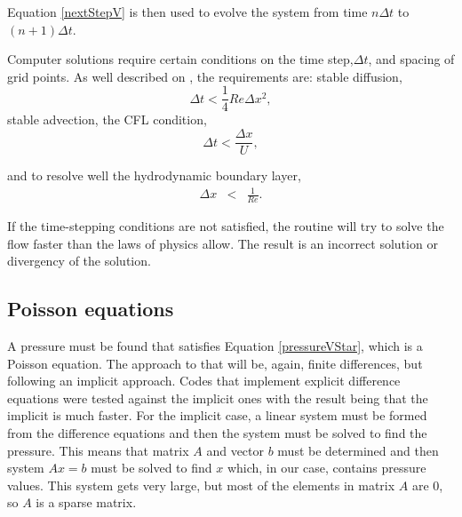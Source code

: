 \documentclass[journal]{IEEEtran}
\begin{document}
Equation \ref{nextStepV} is then used to evolve the system from time $n \Delta t$ to $(n+1)\Delta t$. 

Computer solutions require certain conditions on the time step,$\Delta t$, and spacing of grid points. As well described on \cite{hinchLectureNotes}, the requirements are: stable diffusion, 
\begin{equation}
\Delta t < \frac{1}{4}\mathit{Re}\Delta x^2, \label{stablediffusion}
\end{equation} stable advection, the CFL condition,
\begin{equation}
\Delta t < \frac{\Delta x}{U}, \label{stableadvection}
\end{equation}

 and to resolve well the hydrodynamic boundary layer,  
 \begin{eqnarray}
\Delta x &<& \frac{1}{\mathit{Re}}. \label{boundarylayer}
\end{eqnarray} 

If the time-stepping conditions are not satisfied, the routine will try to solve the flow faster than the laws of physics allow. The result is an incorrect solution or divergency of the solution.


\subsection{Poisson equations}

A pressure must be found that satisfies Equation \ref{pressureVStar}, which is a Poisson equation. The approach to that will be, again, finite differences, but following an implicit approach. Codes that implement explicit difference equations were tested against the implicit ones with the result being that the implicit is much faster. For the implicit case, a linear system must be formed from the difference equations and then the system must be solved to find the pressure. This means that matrix $A$ and vector $b$ must be determined and then system $Ax = b$ must be solved to find $x$ which, in our case, contains pressure values. This system gets very large, but most of the elements in matrix $A$ are 0, so $A$ is a sparse matrix. 
\end{document}
